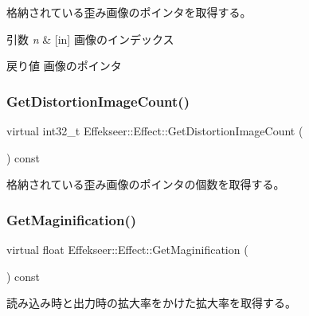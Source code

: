 格納されている歪み画像のポインタを取得する。 


\begin{DoxyParams}{引数}
{\em n} & \mbox{[}in\mbox{]} 画像のインデックス \\
\hline
\end{DoxyParams}
\begin{DoxyReturn}{戻り値}
画像のポインタ 
\end{DoxyReturn}
\mbox{\label{class_effekseer_1_1_effect_a25718ad6a563549f2b6c12fb70827b38}} 
\subsubsection{\texorpdfstring{Get\+Distortion\+Image\+Count()}{GetDistortionImageCount()}}
{\footnotesize\ttfamily virtual int32\+\_\+t Effekseer\+::\+Effect\+::\+Get\+Distortion\+Image\+Count (\begin{DoxyParamCaption}{ }\end{DoxyParamCaption}) const\hspace{0.3cm}{\ttfamily [pure virtual]}}



格納されている歪み画像のポインタの個数を取得する。 

\mbox{\label{class_effekseer_1_1_effect_a602986b894af1ccdc749421648aa380f}} 
\subsubsection{\texorpdfstring{Get\+Maginification()}{GetMaginification()}}
{\footnotesize\ttfamily virtual float Effekseer\+::\+Effect\+::\+Get\+Maginification (\begin{DoxyParamCaption}{ }\end{DoxyParamCaption}) const\hspace{0.3cm}{\ttfamily [pure virtual]}}



読み込み時と出力時の拡大率をかけた拡大率を取得する。 

